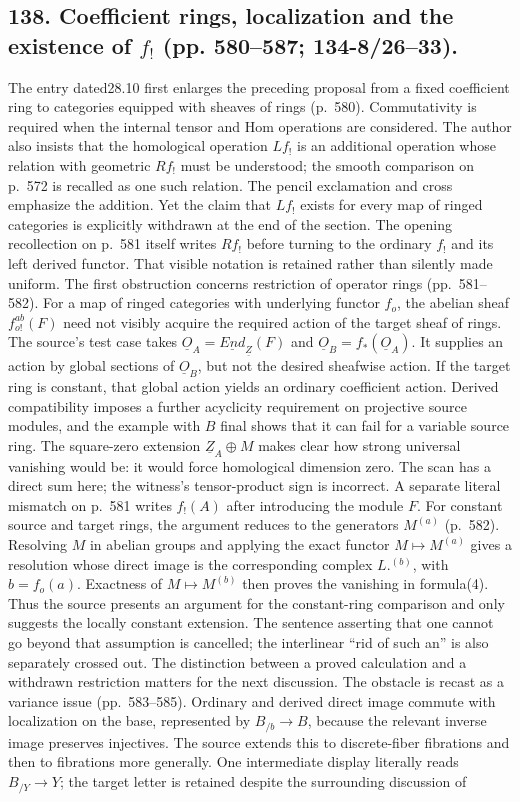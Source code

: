 \documentclass[10pt,oneside]{book}
\begin{document}
\subsection*{138. Coefficient rings, localization and the existence of $f_!$ (pp. 580--587; 134-8/26--33).}
The entry dated28.10 first enlarges the preceding proposal from a fixed coefficient ring to categories equipped with sheaves of rings (p.~580). Commutativity is required when the internal tensor and Hom operations are considered. The author also insists that the homological operation $Lf_!$ is an additional operation whose relation with geometric $Rf_!$ must be understood; the smooth comparison on p.~572 is recalled as one such relation. The pencil exclamation and cross emphasize the addition. Yet the claim that $Lf_!$ exists for every map of ringed categories is explicitly withdrawn at the end of the section. The opening recollection on p.~581 itself writes $Rf_!$ before turning to the ordinary $f_!$ and its left derived functor. That visible notation is retained rather than silently made uniform. The first obstruction concerns restriction of operator rings (pp.~581--582). For a map of ringed categories with underlying functor $f_o$, the abelian sheaf $f^{ab}_{o!}(F)$ need not visibly acquire the required action of the target sheaf of rings. The source's test case takes $\underline O_A=\underline{End}_{\underline Z}(F)$ and $\underline O_B=f_*(\underline O_A)$. It supplies an action by global sections of $\underline O_B$, but not the desired sheafwise action. If the target ring is constant, that global action yields an ordinary coefficient action. Derived compatibility imposes a further acyclicity requirement on projective source modules, and the example with $B$ final shows that it can fail for a variable source ring. The square-zero extension $\underline Z_A\oplus M$ makes clear how strong universal vanishing would be: it would force homological dimension zero. The scan has a direct sum here; the witness's tensor-product sign is incorrect. A separate literal mismatch on p.~581 writes $f_!(A)$ after introducing the module $F$. For constant source and target rings, the argument reduces to the generators $M^{(a)}$ (p.~582). Resolving $M$ in abelian groups and applying the exact functor $M\mapsto M^{(a)}$ gives a resolution whose direct image is the corresponding complex $L.^{(b)}$, with $b=f_o(a)$. Exactness of $M\mapsto M^{(b)}$ then proves the vanishing in formula(4). Thus the source presents an argument for the constant-ring comparison and only suggests the locally constant extension. The sentence asserting that one cannot go beyond that assumption is cancelled; the interlinear ``rid of such an'' is also separately crossed out. The distinction between a proved calculation and a withdrawn restriction matters for the next discussion. The obstacle is recast as a variance issue (pp.~583--585). Ordinary and derived direct image commute with localization on the base, represented by $B_{/b}\to B$, because the relevant inverse image preserves injectives. The source extends this to discrete-fiber fibrations and then to fibrations more generally. One intermediate display literally reads $B_{/Y}\to Y$; the target letter is retained despite the surrounding discussion of 
\end{document}
